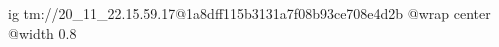  
 
 
 
 

\qqSecOrig


\ifcmt
  ig tm://20_11_22.15.59.17@1a8dff115b3131a7f08b93ce708e4d2b
  @wrap center
  @width 0.8
\fi

